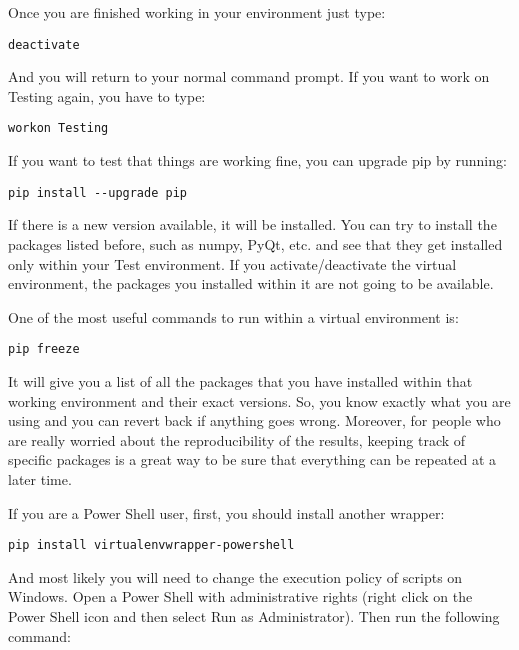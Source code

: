 Once you are finished working in your environment just type:

\begin{verbatim}
deactivate
\end{verbatim}

And you will return to your normal command prompt. If you want to work on Testing again, you have to type:

\begin{verbatim}
workon Testing
\end{verbatim}

If you want to test that things are working fine, you can upgrade pip by running:

\begin{verbatim}
pip install --upgrade pip
\end{verbatim}

If there is a new version available, it will be installed. You can try to install the packages listed before, such as numpy, PyQt, etc. and see that they get installed only within your Test environment. If you activate/deactivate the virtual environment, the packages you installed within it are not going to be available.

One of the most useful commands to run within a virtual environment is:

\begin{verbatim}
pip freeze
\end{verbatim}

It will give you a list of all the packages that you have installed within that working environment and their exact versions. So, you know exactly what you are using and you can revert back if anything goes wrong. Moreover, for people who are really worried about the reproducibility of the results, keeping track of specific packages is a great way to be sure that everything can be repeated at a later time.


If you are a Power Shell user, first, you should install another wrapper:

\begin{verbatim}
pip install virtualenvwrapper-powershell
\end{verbatim}

And most likely you will need to change the execution policy of scripts on Windows. Open a Power Shell with administrative rights (right click on the Power Shell icon and then select Run as Administrator). Then run the following command:

